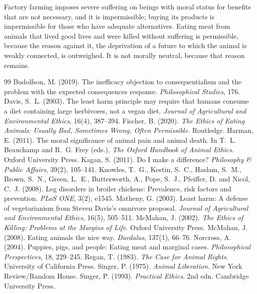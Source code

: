 \documentclass{situationist-preprint}
\begin{document}
Factory farming imposes severe suffering on beings with moral status for benefits that are not necessary, and it is impermissible; buying its products is impermissible for those who have adequate alternatives. Eating meat from animals that lived good lives and were killed without suffering is permissible, because the reason against it, the deprivation of a future to which the animal is weakly connected, is outweighed. It is not morally neutral, because that reason remains.

\begin{thebibliography}{99}\small
{} Budolfson, M. (2019). The inefficacy objection to consequentialism and the problem with the expected consequences response. \emph{Philosophical Studies}, 176.
 Davis, S.~L. (2003). The least harm principle may require that humans consume a diet containing large herbivores, not a vegan diet. \emph{Journal of Agricultural and Environmental Ethics}, 16(4), 387--394.
 Fischer, B. (2020). \emph{The Ethics of Eating Animals: Usually Bad, Sometimes Wrong, Often Permissible}. Routledge.
 Harman, E. (2011). The moral significance of animal pain and animal death. In T.~L. Beauchamp and R.~G. Frey (eds.), \emph{The Oxford Handbook of Animal Ethics}. Oxford University Press.
 Kagan, S. (2011). Do I make a difference? \emph{Philosophy \& Public Affairs}, 39(2), 105--141.
 Knowles, T.~G., Kestin, S.~C., Haslam, S.~M., Brown, S.~N., Green, L.~E., Butterworth, A., Pope, S.~J., Pfeiffer, D. and Nicol, C.~J. (2008). Leg disorders in broiler chickens: Prevalence, risk factors and prevention. \emph{PLoS ONE}, 3(2), e1545.
 Matheny, G. (2003). Least harm: A defense of vegetarianism from Steven Davis's omnivore proposal. \emph{Journal of Agricultural and Environmental Ethics}, 16(5), 505--511.
 McMahan, J. (2002). \emph{The Ethics of Killing: Problems at the Margins of Life}. Oxford University Press.
 McMahan, J. (2008). Eating animals the nice way. \emph{Daedalus}, 137(1), 66--76.
 Norcross, A. (2004). Puppies, pigs, and people: Eating meat and marginal cases. \emph{Philosophical Perspectives}, 18, 229--245.
 Regan, T. (1983). \emph{The Case for Animal Rights}. University of California Press.
 Singer, P. (1975). \emph{Animal Liberation}. New York Review/Random House.
 Singer, P. (1993). \emph{Practical Ethics}. 2nd edn. Cambridge University Press.
\end{thebibliography}
\end{document}
